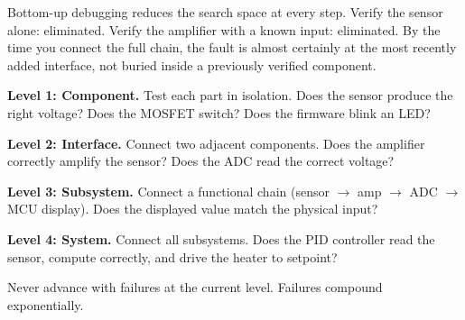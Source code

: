 \documentclass[11pt,letterpaper,twoside,openany]{book}
\begin{document}
Bottom-up debugging reduces the search space at every step. Verify the sensor alone: eliminated. Verify the amplifier with a known input: eliminated. By the time you connect the full chain, the fault is almost certainly at the most recently added interface, not buried inside a previously verified component.

\begin{keyconceptbox}
\textbf{Level 1: Component.} Test each part in isolation. Does the sensor produce the right voltage? Does the MOSFET switch? Does the firmware blink an LED?

\textbf{Level 2: Interface.} Connect two adjacent components. Does the amplifier correctly amplify the sensor? Does the ADC read the correct voltage?

\textbf{Level 3: Subsystem.} Connect a functional chain (sensor $\to$ amp $\to$ ADC $\to$ MCU display). Does the displayed value match the physical input?

\textbf{Level 4: System.} Connect all subsystems. Does the PID controller read the sensor, compute correctly, and drive the heater to setpoint?

Never advance with failures at the current level. Failures compound exponentially.
\end{keyconceptbox}
\end{document}
